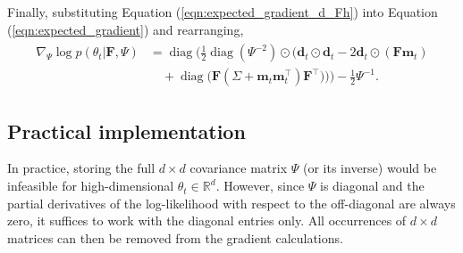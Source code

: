 \documentclass[msc,deptreport.inf]{infthesis} %
\newcommand{\matr}[1]{\mathbf{#1}}
\newcommand{\R}{\mathbb R}
\newcommand{\diag}{\mathop{\mathrm{diag}}}
\begin{document}
Finally, substituting Equation (\ref{eqn:expected_gradient_d_Fh}) into Equation (\ref{eqn:expected_gradient}) and rearranging, 
\begin{align}
\begin{split}\label{eqn:derivatives_wrt_Psi}
	\nabla_{\Psi} \log p(\theta_t | \matr{F}, \Psi) 
	& = \diag\Bigg(\frac{1}{2} \diag(\Psi^{-2}) \odot \Big(\matr{d}_t \odot \matr{d}_t - 2\matr{d}_t \odot (\matr{F} \matr{m}_t) \\
	& \quad + \diag\big( \matr{F} (\Sigma + \matr{m}_t \matr{m}_t^\intercal) \matr{F}^\intercal \big) \Big) \Bigg)
	 - \frac{1}{2} \Psi^{-1}.
\end{split}
\end{align} 

\subsection{Practical implementation}

In practice, storing the full $d\times d$ covariance matrix $\Psi$ (or its inverse) would be infeasible for high-dimensional $\theta_t \in \R^d$. However, since $\Psi$ is diagonal and the partial derivatives of the log-likelihood with respect to the off-diagonal are always zero, it suffices to work with the diagonal entries only. All occurrences of $d \times d$ matrices can then be removed from the gradient calculations. 
\end{document}
